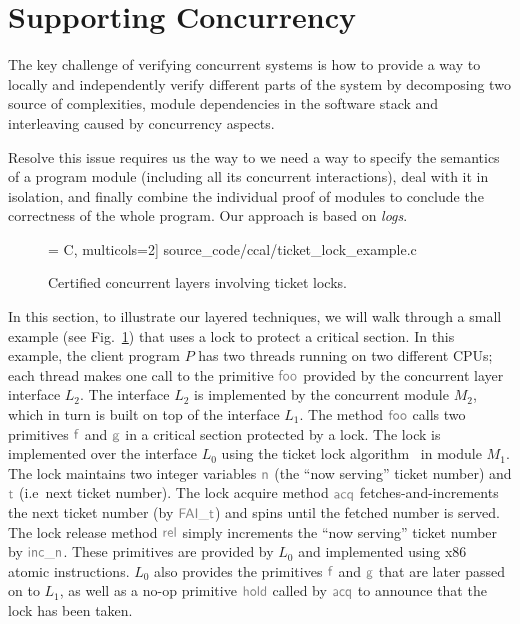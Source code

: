 \section{Supporting Concurrency}
\label{chapter:ccal:sec:ccal-overview}

The key challenge of verifying concurrent systems is how to
provide a way to locally and independently verify different parts of the system 
by decomposing
two source of complexities, module dependencies in the software stack and interleaving caused by concurrency aspects.

%

Resolve this issue requires us the way to 
we need a way
to specify the semantics of a program module (including all its
concurrent interactions), deal with it in isolation, and finally
combine the individual proof of modules to
conclude the correctness of the whole program. 
 Our approach is based on
\emph{logs}.

\begin{figure}
 = C, multicols=2] {source_code/ccal/ticket_lock_example.c}
\caption{Certified concurrent layers involving ticket locks.}
\label{fig:exp:ticket_lock_example}
\end{figure}

In this section, to illustrate our layered techniques, we will walk through a small  example
(see Fig.~\ref{fig:exp:ticket_lock_example}) that uses a lock to protect a
critical section. In this example, the client program $P$ has two threads running on
two different CPUs; each thread makes one call to the primitive
$\commc{foo}$ provided by the concurrent  layer interface $L_2$. 
The interface
$L_2$ is implemented by the concurrent  module $M_2$, which in
turn is built on top of the interface $L_1$. The method $\commc{foo}$
calls two primitives $\commc{f}$ and $\commc{g}$ in a critical section
protected by a lock.  The lock is implemented over the
interface $L_0$ using the ticket lock
algorithm~\cite{mcs91} in module $M_1$.  The lock maintains two 
integer variables $\commc{n}$ (the ``now serving'' ticket number) and $\commc{t}$ (i.e\, next ticket number). The lock acquire method $\commc{acq}$ fetches-and-increments the next ticket number (by $\commc{FAI\_t}$) 
and spins until the fetched  number is served.
The lock release method $\commc{rel}$ simply increments the ``now serving'' ticket number by $\commc{inc\_n}$. These primitives are provided by $L_0$ and  implemented using x86 atomic instructions. $L_0$ also provides the primitives $\commc{f}$ and $\commc{g}$ that are later passed on to $L_1$,
as well as a no-op primitive $\commc{hold}$ called by $\commc{acq}$ to
announce that the lock has been taken.


